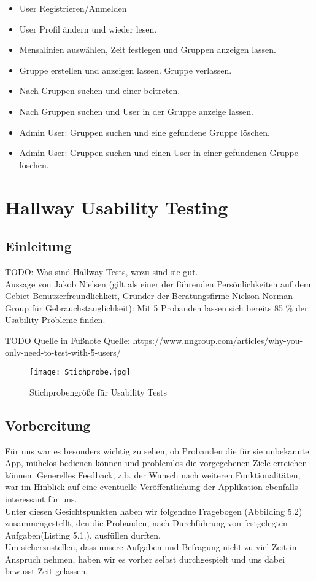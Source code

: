 \documentclass[a4paper]{scrreprt}
\begin{document}
\begin{itemize}

\item User Registrieren/Anmelden
\item User Profil ändern und wieder lesen.
\item Mensalinien auswählen, Zeit festlegen und Gruppen anzeigen lassen.
\item Gruppe erstellen und anzeigen lassen. Gruppe verlassen.
\item Nach Gruppen suchen und einer beitreten.
\item Nach Gruppen suchen und User in der Gruppe anzeige lassen.
\item Admin User: Gruppen suchen und eine gefundene Gruppe löschen.
\item Admin User: Gruppen suchen und einen User in einer gefundenen Gruppe löschen.


\end{itemize}


\chapter{Hallway Usability Testing}

\section{Einleitung}
TODO: Was sind Hallway Tests, wozu sind sie gut. \\

Aussage von Jakob Nielsen (gilt als einer der führenden Persönlichkeiten auf dem Gebiet Benutzerfreundlichkeit, Gründer der Beratungsfirme Nielson Norman Group für Gebrauchstauglichkeit): Mit 5 Probanden lassen sich bereits 85 \% der Usability Probleme finden.

TODO Quelle in Fußnote
Quelle:  https://www.nngroup.com/articles/why-you-only-need-to-test-with-5-users/ 
\begin{figure}[ht]
	\centering
  \texttt{[image: Stichprobe.jpg]}
	\caption{Stichprobengröße für Usability Tests}
	\label{fig2}
\end{figure}
\newpage
\section{Vorbereitung}
Für uns war es besonders wichtig zu sehen, ob Probanden die für sie unbekannte App, mühelos bedienen können und problemlos die vorgegebenen Ziele erreichen können.
Generelles Feedback, z.b. der Wunsch nach weiteren Funktionalitäten, war im Hinblick auf eine eventuelle Veröffentlichung der Applikation ebenfalls interessant für uns. \\
Unter diesen Gesichtspunkten haben wir folgendne Fragebogen (Abbilding 5.2) zusammengestellt, den die Probanden, nach Durchführung von festgelegten Aufgaben(Listing 5.1.), ausfüllen durften.\\
Um sicherzustellen, dass unsere Aufgaben und Befragung nicht zu viel Zeit in Anspruch nehmen, haben wir es vorher selbst durchgespielt und uns dabei bewusst Zeit gelassen.
\end{document}
